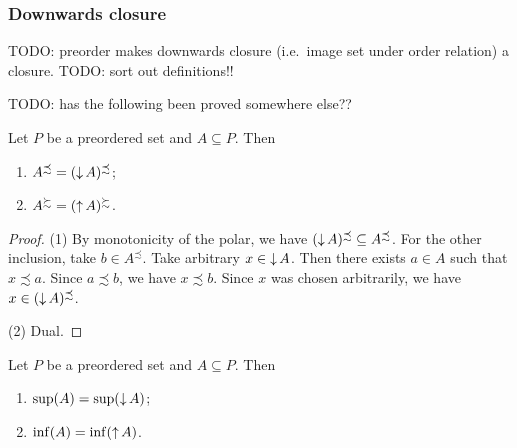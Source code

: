 \subsubsection{Downwards closure}
TODO: preorder makes downwards closure (i.e.\ image set under order relation) a closure. TODO: sort out definitions!!

TODO: has the following been proved somewhere else??
\begin{lemma}
Let $P$ be a preordered set and $A\subseteq P$. Then
\begin{enumerate}
\item $A^\precsim = (\operatorname{\downarrow} A)^\precsim$;
\item $A^\succsim = (\operatorname{\uparrow} A)^\succsim$.
\end{enumerate}
\end{lemma}
\begin{proof}
(1) By monotonicity of the polar, we have $(\operatorname{\downarrow} A)^\precsim \subseteq A^\precsim$. For the other inclusion, take $b \in A^\precsim$. Take arbitrary $x\in \operatorname{\downarrow} A$. Then there exists $a\in A$ such that $x \precsim a$. Since $a \precsim b$, we have $x\precsim b$. Since $x$ was chosen arbitrarily, we have $x\in (\operatorname{\downarrow} A)^\precsim$.

(2) Dual.
\end{proof}
\begin{corollary} \label{extremaAfterOrderClosure}
Let $P$ be a preordered set and $A\subseteq P$. Then
\begin{enumerate}
\item $\sup(A) = \sup(\operatorname{\downarrow} A)$;
\item $\inf(A) = \inf(\operatorname{\uparrow} A)$.
\end{enumerate}
\end{corollary}

